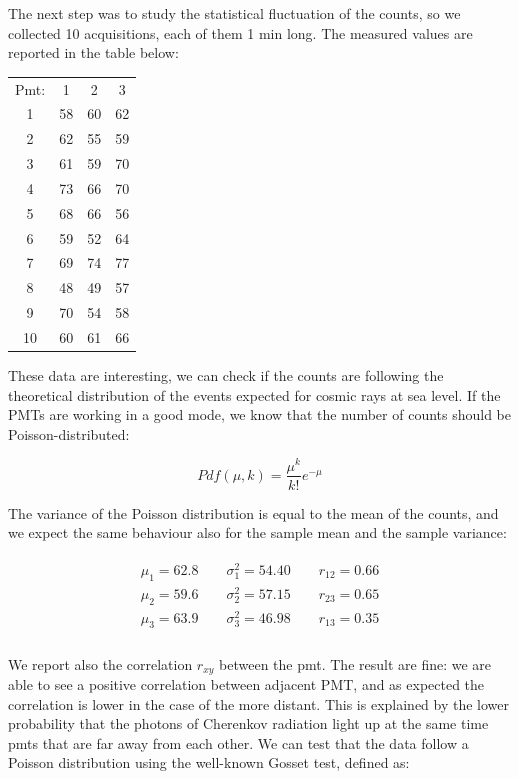 The next step was to study the statistical fluctuation of the counts, so we collected 10 acquisitions, each of them 1 min long. The measured values are reported in the table below:

\begin{center}
\begin{tabular}{|c|c|c|c|}
\hline 
Pmt: & 1 & 2 & 3 \\ 
1 & 58 & 60 & 62 \\ 
\hline 
2 & 62 & 55 & 59 \\ 
\hline 
3 & 61 & 59 & 70 \\ 
\hline 
4 & 73 & 66 & 70 \\ 
\hline 
5 & 68 & 66 & 56 \\ 
\hline 
6 & 59 & 52 & 64 \\ 
\hline 
7 & 69 & 74 & 77 \\ 
\hline 
8 & 48 & 49 & 57  \\ 
\hline 
9 & 70 & 54 & 58 \\ 
\hline 
10 & 60 & 61 & 66\\
\hline
\end{tabular} 
\end{center}

These data are interesting, we can check if the counts are following the theoretical distribution of the events expected for cosmic rays at sea level. If the PMTs are working in a good mode, we know that the number of counts should be Poisson-distributed:

\begin{equation}
Pdf(\mu,k) =  \frac{\mu^{k}}{k!} e^{-\mu}
\end{equation}

The variance of the Poisson distribution is equal to the mean of the counts, and we expect the same behaviour also for the sample mean and the sample variance:

\begin{align*}
\begin{split}
\mu_{1} = 62.8	\qquad \sigma^{2}_{1} = 54.40 \qquad r_{12} = 0.66\\
\mu_{2} = 59.6	\qquad \sigma^{2}_{2} = 57.15 \qquad r_{23} = 0.65\\
\mu_{3} = 63.9	\qquad \sigma^{2}_{3} = 46.98 \qquad r_{13} = 0.35 \\
\end{split}
\end{align*}

We report also the correlation $r_{xy}$ between the pmt. The result are fine: we are able to see a positive correlation between adjacent PMT, and as expected the correlation is lower in the case of the more distant. This is explained by the lower probability that the photons of Cherenkov radiation light up at the same time pmts that are far away from each other.
We can test that the data follow a Poisson distribution using the well-known Gosset test, defined as:

